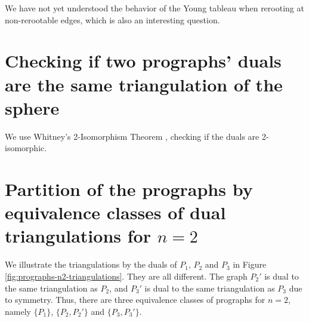 We have not yet understood the behavior of the Young tableau when rerooting at non-rerootable edges, which is also an interesting question.

\section{Checking if two prographs' duals are the same triangulation of the sphere}

We use Whitney's 2-Isomorphism Theorem \cite{whitney19922}, checking if the duals are 2-isomorphic.

\section{Partition of the prographs by equivalence classes of dual triangulations for \texorpdfstring{$n=2$}{n=2}}

We illustrate the triangulations by the duals of $P_1$, $P_2$ and $P_3$ in Figure   \ref{fig:prographs-n2-triangulations}. They are all different. The graph $P_2'$ is dual to the same triangulation as $P_2$, and $P_3'$ is dual to the same triangulation as $P_3$ due to symmetry. Thus, there are three equivalence classes of prographs for $n=2$, namely $\{P_1\}$, $\{P_2, P_2'\}$ and $\{P_3, P_3'\}$.

